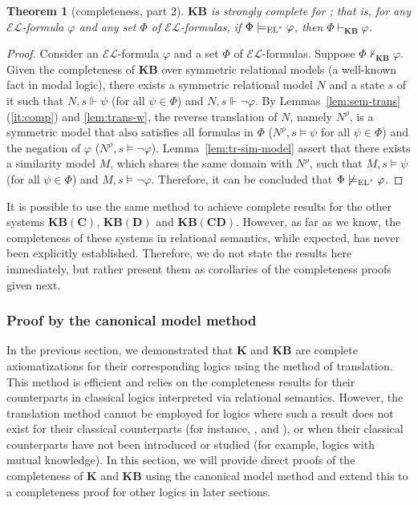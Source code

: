 \documentclass{article}
\newtheorem{theorem}{Theorem}
\renewcommand{\phi}{\varphi}
\newcommand{\lang}{\ensuremath{\mathcal{EL}}\xspace}
\newcommand{\ls}{\text{\normalfont EL$^s$}\xspace}
\newcommand{\lsc}{\text{\normalfont ELC$^s$}\xspace}
\newcommand{\lsd}{\text{\normalfont ELD$^s$}\xspace}
\newcommand{\lscd}{\text{\normalfont ELCD$^s$}\xspace}
\newcommand{\K}{\ensuremath{\mathbf{K}}\xspace}
\newcommand{\KB}{\ensuremath{\mathbf{KB}}\xspace}
\newcommand{\KBC}{\ensuremath{\mathbf{KB(C)}}\xspace}
\newcommand{\KBD}{\ensuremath{\mathbf{KB(D)}}\xspace}
\newcommand{\KBCD}{\ensuremath{\mathbf{KB(CD)}}\xspace}
\begin{document}
\begin{theorem}[completeness, part 2]\label{thm:completeness2}
\KB is strongly complete for \ls; that is, for any \lang-formula $\phi$ and any set $\Phi$ of \lang-formulas, if $\Phi \models_\ls \phi$, then $\Phi \vdash_{\KB} \phi$.
\end{theorem}
\begin{proof}
Consider an \lang-formula $\phi$ and a set $\Phi$ of \lang-formulas. Suppose $\Phi \nvdash_{\KB} \phi$. Given the completeness of \KB over symmetric relational models (a well-known fact in modal logic), there exists a symmetric relational model $N$ and a state $s$ of it such that $N,s \Vdash \psi$ (for all $\psi \in \Phi$) and $N,s \Vdash \neg\phi$. By Lemmas~\ref{lem:sem-trans}(\ref{it:comp}) and \ref{lem:trans-w}, the reverse translation of $N$, namely $N^\rho$, is a symmetric model that also satisfies all formulas in $\Phi$ ($N^\rho, s \models \psi$ for all $\psi \in \Phi$) and the negation of $\phi$ ($N^\rho, s \models \neg\phi$). Lemma~\ref{lem:tr-sim-model} assert that there exists a similarity model $M$, which shares the same domain with $N^\rho$, such that $M, s \models \psi$ (for all $\psi \in \Phi$) and $M, s \models \neg\phi$. Therefore, it can be concluded that $\Phi \not\models_\ls \phi$.
\end{proof}

It is possible to use the same method to achieve complete results for the other systems \KBC, \KBD and \KBCD. However, as far as we know, the completeness of these systems in relational semantics, while expected, has never been explicitly established. Therefore, we do not state the results here immediately, but rather present them as corollaries of the completeness proofs given next.

\subsubsection{Proof by the canonical model method}
\label{sec:completeness2}

In the previous section, we demonstrated that \K and \KB are complete axiomatizations for their corresponding logics using the method of translation. This method is efficient and relies on the completeness results for their counterparts in classical logics interpreted via relational semantics. However, the translation method cannot be employed for logics where such a result does not exist for their classical counterparts (for instance, \lsc, \lsd and \lscd), or when their classical counterparts have not been introduced or studied (for example, logics with mutual knowledge). In this section, we will provide direct proofs of the completeness of \K and \KB using the canonical model method and extend this to a completeness proof for other logics in later sections.
\end{document}
